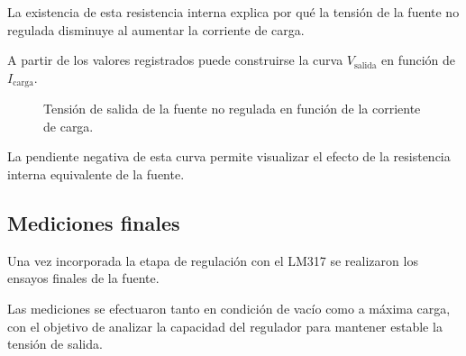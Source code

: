 \documentclass[12pt,a4paper]{article}
\begin{document}
	La existencia de esta resistencia interna explica por qué la tensión de la fuente
	no regulada disminuye al aumentar la corriente de carga.
	
	A partir de los valores registrados puede construirse la curva
	$V_{\text{salida}}$ en función de $I_{\text{carga}}$.
	
	\begin{figure}[H]
	\centering
	
	
	\caption{Tensión de salida de la fuente no regulada en función de la corriente de carga.}
	\label{fig:vi_no_regulada}
	
	\end{figure}
		
	La pendiente negativa de esta curva permite visualizar el efecto de la
	resistencia interna equivalente de la fuente.
	
	\subsection{Mediciones finales}
	
	Una vez incorporada la etapa de regulación con el LM317 se realizaron los
	ensayos finales de la fuente.
	
	Las mediciones se efectuaron tanto en condición de vacío como a máxima carga,
	con el objetivo de analizar la capacidad del regulador para mantener estable la
	tensión de salida.
	
\end{document}
